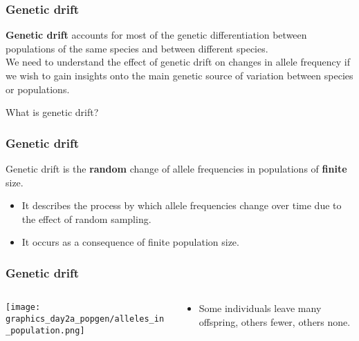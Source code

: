 \documentclass{beamer}
\newcommand{\1}{\ensuremath{\mathbf{1}}}
\begin{document}
%
%
%
\begin{frame}\frametitle{Genetic drift}
	\textbf{Genetic drift} accounts for most of the genetic differentiation between populations of the same species and between different species.\\[2ex]
	We need to understand the effect of genetic drift on changes in allele frequency if we wish to gain insights onto the main genetic source of variation between species or populations.\\[2ex]
	\begin{block}{}
		What is genetic drift?
	\end{block}
\end{frame}
%
%
%
\begin{frame}\frametitle{Genetic drift}
	\begin{block}{}
		Genetic drift is the \textbf{random} change of allele frequencies in populations of \textbf{finite} size.
	\end{block}
	\begin{itemize}
		\item It describes the process by which allele frequencies change over time due to the effect of random sampling.
		\item It occurs as a consequence of finite population size.
	\end{itemize}
\end{frame}
%
%
%
\begin{frame}\frametitle{Genetic drift}
	\begin{columns}
	\begin{column}{.3\textwidth}
		\begin{center}
		\texttt{[image: graphics\_day2a\_popgen/alleles\_in\_population.png]}
		\end{center}
	\end{column}
	\begin{column}{.7\textwidth}
		\begin{itemize}
			\item Some individuals leave many offspring, others fewer, others none.
		\end{itemize}
	\end{column}
	\end{columns}
\end{frame}
\end{document}
